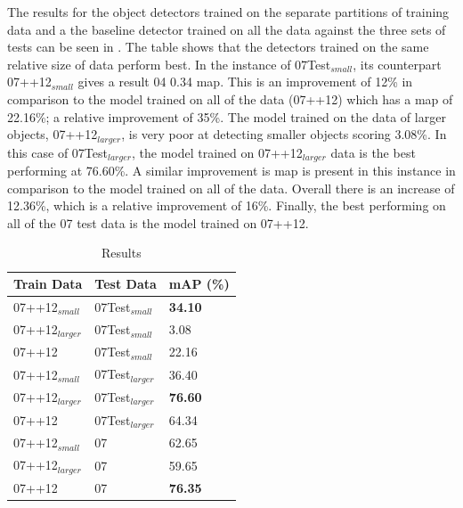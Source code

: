 The results for the object detectors trained on the separate partitions of training data and a the baseline detector trained on all the data against the three sets of tests can be seen in . The table shows that the detectors trained on the same relative size of data perform best. In the instance of 07Test$_{small}$, its counterpart 07++12$_{small}$ gives a result 04 0.34 \gls{map}. This is an improvement of 12\% in comparison to the model trained on all of the data (07++12) which has a \gls{map} of 22.16\%; a relative improvement of 35\%. The model trained on the data of larger objects, 07++12$_{larger}$, is very poor at detecting smaller objects scoring 3.08\%. In this case of 07Test$_{larger}$, the model trained on 07++12$_{larger}$ data is the best performing at 76.60\%. A similar improvement is \gls{map} is present in this instance in comparison to the model trained on all of the data. Overall there is an increase of 12.36\%, which is a relative improvement of 16\%. Finally, the best performing on all of the 07 test data is the model trained on 07++12.


\begin{table}[h]
\centering
\caption{Results}
\label{tab:resresults}
\begin{tabular}{|l|l|l|}
\hline
\textbf{Train Data}    & \textbf{Test Data}     & \textbf{mAP (\%)} \\ \hline
07++12$_{small}$ & 07Test$_{small}$  & \textbf{34.10}   \\ \hline
07++12$_{larger}$  & 07Test$_{small}$ & 3.08     \\ \hline
07++12   & 07Test$_{small}$           & 22.16    \\ \hline
07++12$_{small}$ & 07Test$_{larger}$  &  36.40   \\ \hline
07++12$_{larger}$ & 07Test$_{larger}$ &  \textbf{76.60}   \\ \hline
07++12 & 07Test$_{larger}$           &  64.34   \\ \hline
07++12$_{small}$       & 07   & 62.65    \\ \hline
07++12$_{larger}$       & 07  &  59.65   \\ \hline
07++12        & 07            &  \textbf{76.35}   \\ \hline 
\end{tabular}
\end{table}
